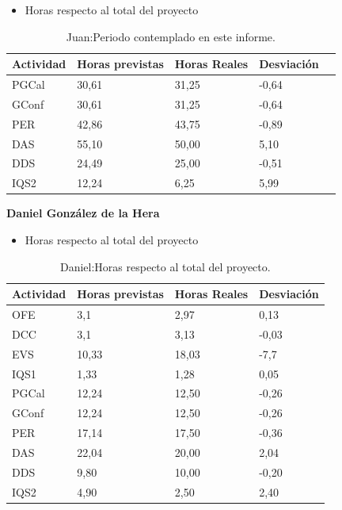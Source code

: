 \begin{itemize}
\item Horas respecto al total del proyecto
\end{itemize}
\begin{table}[H]
\begin{center}
\begin{tabular}{ l l l l l }
  Actividad & Horas previstas & Horas Reales & Desviación \\ \hline \hline
PGCal	&	30,61	&	31,25	&	-0,64	\\ \hline
GConf	&	30,61	&	31,25	&	-0,64	\\ \hline
PER	&	42,86	&	43,75	&	-0,89	\\ \hline
DAS	&	55,10	&	50,00	&	5,10	\\ \hline
DDS	&	24,49	&	25,00	&	-0,51	\\ \hline
IQS2	&	12,24	&	6,25	&	5,99	\\ \hline
\end{tabular}
\caption{Juan:Periodo contemplado en este informe.}
\label{tab:Juan:PeriodoContempladoInforme_2}
\end{center}
\end{table}

\newpage


\textbf{Daniel González de la Hera}
\begin{itemize}
\item Horas respecto al total del proyecto
\end{itemize}
\begin{table}[H]
\begin{center}
\begin{tabular}{ l l l l }
  Actividad & Horas previstas & Horas Reales & Desviación \\ \hline \hline
OFE	&	3,1	&	2,97	&	0,13	\\ \hline
DCC	&	3,1	&	3,13	&	-0,03	\\ \hline
EVS	&	10,33	&	18,03	&	-7,7	\\ \hline
IQS1	&	1,33	&	1,28	&	0,05	\\ \hline
PGCal	&	12,24	&	12,50	&	-0,26	\\ \hline
GConf	&	12,24	&	12,50	&	-0,26	\\ \hline
PER	&	17,14	&	17,50	&	-0,36	\\ \hline
DAS	&	22,04	&	20,00	&	2,04	\\ \hline
DDS	&	9,80	&	10,00	&	-0,20	\\ \hline
IQS2	&	4,90	&	2,50	&	2,40	\\ \hline
\end{tabular}
\caption{Daniel:Horas respecto al total del proyecto.}
\label{tab:Daniel:HorasTotalInforme_2}
\end{center}
\end{table}

